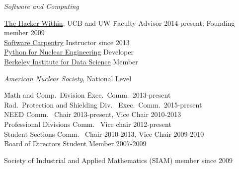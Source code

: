\vspace*{-.5em}
\textit{Software and Computing}
\begin{tabbing}
\hspace*{2 em}\= \href{http://thehackerwithin.github.io/berkeley/}{The Hacker Within}, UCB and UW \hspace*{3em} \= Faculty Advisor 2014-present; Founding member 2009\\
%
\> \href{http://software-carpentry.org/}{Software Carpentry}  \> Instructor since 2013\\
%
\> \href{http://pyne.io/}{Python for Nuclear Engineering}  \> Developer \\
%
\> \href{http://bids.berkeley.edu/}{Berkeley Institute for Data Science} \> Member%
\end{tabbing}
%
\textit{American Nuclear Society}, National Level
\begin{tabbing}
\hspace*{2 em}\= Math and Comp.\ Division \hspace*{6em} \= Exec.\ Comm.\ 2013-present \\
%
\> Rad.\ Protection and Shielding Div.\ \> Exec.\ Comm.\ 2015-present\\
%
%
\> NEED Comm.\ \> Chair 2013-present, Vice Chair 2010-2013\\
%
\> Professional Divisions Comm.\ \>	Vice chair 2012-present \\
%
\> Student Sections Comm.\ \> Chair 2010-2013, Vice Chair 2009-2010\\
%
%
\> Board of Directors \>	Student Member 2007-2009
%
\end{tabbing}

Society of Industrial and Applied Mathematics (SIAM) member since 2009 


